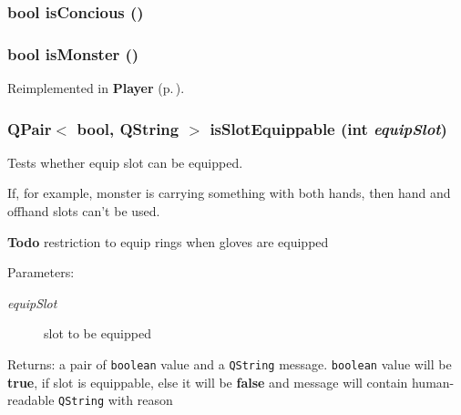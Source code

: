 \subsubsection{\setlength{\rightskip}{0pt plus 5cm}bool is\-Concious ()}\label{classMonster_a12}


\subsubsection{\setlength{\rightskip}{0pt plus 5cm}bool is\-Monster ()\hspace{0.3cm}{\tt  [virtual]}}\label{classMonster_a27}




Reimplemented in {\bf Player} {\rm (p.\,\pageref{classPlayer_a2})}.
\subsubsection{\setlength{\rightskip}{0pt plus 5cm}QPair$<$ bool, QString $>$ is\-Slot\-Equippable (int {\em equip\-Slot})}\label{classMonster_a20}


Tests whether equip slot can be equipped. 

If, for example, monster is carrying something with both hands, then hand and offhand slots can't be used.

\begin{Desc}
\item[{\bf Todo}]restriction to equip rings when gloves are equipped\end{Desc}
\begin{Desc}
\item[Parameters:]
\begin{description}
\item[{\em equip\-Slot}]slot to be equipped\end{description}
\end{Desc}
\begin{Desc}
\item[Returns:]a pair of {\tt boolean} value and a {\tt QString} message. {\tt boolean} value will be {\bf true}, if slot is equippable, else it will be {\bf false} and message will contain human-readable {\tt QString} with reason\end{Desc}
